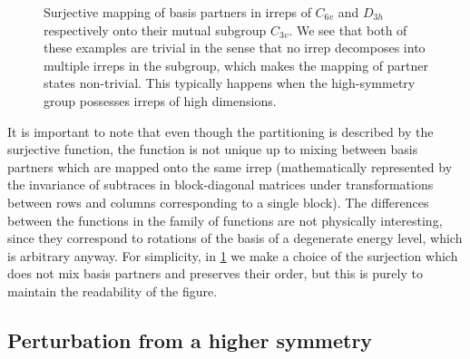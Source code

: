 \documentclass[12pt]{article}
\begin{document}
\begin{figure}[h]
\begin{center}
	\end{center}
	\caption{Surjective mapping of basis partners in irreps of $C_{6v}$ and $D_{3h}$ respectively onto their mutual subgroup $C_{3v}$. We see that both of these examples are trivial in the sense that no irrep decomposes into multiple irreps in the subgroup, which makes the mapping of partner states non-trivial. This typically happens when the high-symmetry group possesses irreps of high dimensions.}
	\label{fig:basis_vector_surjection}
	\end{figure}
	
	It is important to note that even though the partitioning is described by the surjective function, the function is not unique up to mixing between basis partners which are mapped onto the same irrep (mathematically represented by the invariance of subtraces in block-diagonal matrices under transformations between rows and columns corresponding to a single block). The differences between the functions in the family of functions are not physically interesting, since they correspond to rotations of the basis of a degenerate energy level, which is arbitrary anyway. For simplicity, in \ref{fig:basis_vector_surjection} we make a choice of the surjection which does not mix basis partners and preserves their order, but this is purely to maintain the readability of the figure.
	
	\subsection{Perturbation from a higher symmetry} \label{sec:perturbation}
\end{document}

